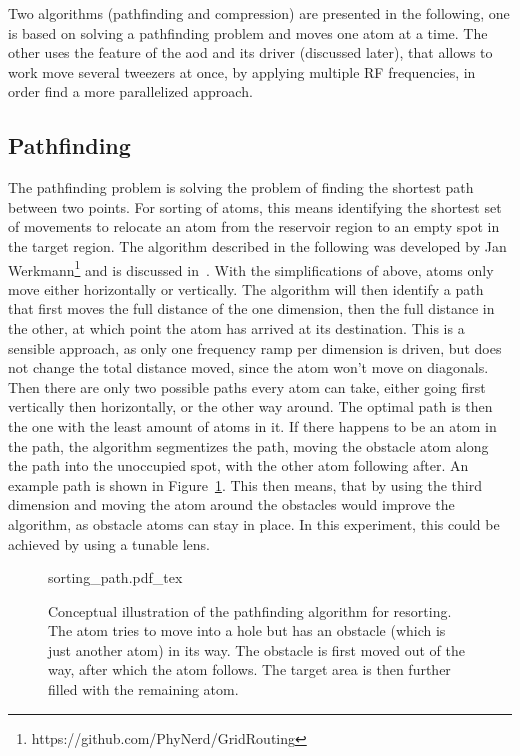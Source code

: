 Two algorithms (pathfinding and compression) are presented in the following, one is based on solving a pathfinding problem and moves one atom at a time. The other uses the feature of the \ac{aod} and its driver (discussed later), that allows to work move several tweezers at once, by applying multiple RF frequencies, in order find a more parallelized approach.


\subsection{Pathfinding}

The pathfinding problem is solving the problem of finding the shortest path between two points. For sorting of atoms, this means identifying the shortest set of movements to relocate an atom from the reservoir region to an empty spot in the target region.
The algorithm described in the following was developed by Jan Werkmann\footnote{https://github.com/PhyNerd/GridRouting} and is discussed in~\cite{OhldeMello2020}. With the simplifications of above, atoms only move either horizontally or vertically. The algorithm will then identify a path that first moves the full distance of the one dimension, then the full distance in the other, at which point the atom has arrived at its destination. This is a sensible approach, as only one frequency ramp per dimension is driven, but does not change the total distance moved, since the atom won't move on diagonals.
Then there are only two possible paths every atom can take, either going first vertically then horizontally, or the other way around. The optimal path is then the one with the least amount of atoms in it. If there happens to be an atom in the path, the algorithm segmentizes the path, moving the obstacle atom along the path into the unoccupied spot, with the other atom following after. An example path is shown in Figure~\ref{fig:sorting_path}. This then means, that by using the third dimension and moving the atom around the obstacles would improve the algorithm, as obstacle atoms can stay in place. In this experiment, this could be achieved by using a tunable lens.

\begin{figure}[tbp]%
\centering
{sorting_path.pdf_tex}
\caption{Conceptual illustration of the pathfinding algorithm for resorting. The atom tries to move into a hole but has an obstacle (which is just another atom) in its way. The obstacle is first moved out of the way, after which the atom follows. The target area is then further filled with the remaining atom.}%
\label{fig:sorting_path}
\end{figure}

